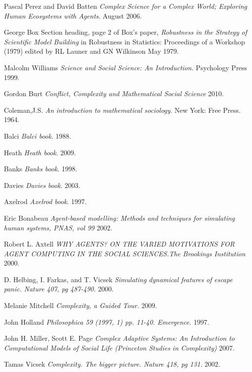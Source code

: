 \documentclass[11pt,oneside,a4paper,openright]{report}
\begin{document}
\begin{thebibliography}{49}
	Pascal Perez and David Batten
	\emph{Complex Science for a Complex World; Exploring Human Ecosystems with Agents}. 
	August 2006.

	George Box 
	Section heading, page 2 of Box's paper, 
	\emph{Robustness in the Strategy of Scientific Model Building} in Robustness in Statistics: Proceedings of a Workshop (1979) 
	edited by RL Launer and GN Wilkinson
	May 1979.

	Malcolm Williams
	\emph{Science and Social Science: An Introduction.} Psychology Press 
	1999. 

	Gordon Burt
	\emph{Conflict, Complexity and Mathematical Social Science}
	2010.

	Coleman,J.S.
	\emph{An introduction to mathematical sociology}. New York: Free Press.
	1964.

	Balci
	\emph{Balci book}.
	1988.

	Heath
	\emph{Heath book}.
	2009.

	Banks
	\emph{Banks book}.
	1998.

	Davies
	\emph{Davies book}.
	2003.

	Axelrod
	\emph{Axelrod book}.
	1997.


	Eric Bonabeau
	\emph{Agent-based modelling: Methods and techniques for simulating human systems, PNAS, vol 99} 
	2002.

	Robert L. Axtell
	\emph{WHY AGENTS? ON THE VARIED MOTIVATIONS FOR AGENT COMPUTING IN THE SOCIAL SCIENCES.The Brookings Institution}
	2000.

	D. Helbing, I. Farkas, and T. Vicsek 
	\emph{Simulating dynamical features of escape panic. Nature 407, pg 487-490.}
	2000.

	Melanie Mitchell
	\emph{Complexity, a Guided Tour.}
	2009.

	John Holland
	\emph{Philosophica 59 (1997, 1) pp. 11-40. Emergence.}
	1997.

	John H. Miller, Scott E. Page
	\emph{Complex Adaptive Systems: An Introduction to Computational Models of Social Life (Princeton Studies in Complexity)}
	2007.

	Tamas Vicsek
	\emph{Complexity. The bigger picture. Nature 418, pg 131.}
	2002.	


\end{thebibliography}
\end{document}
